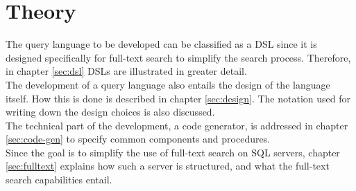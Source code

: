 \newpage
\section{Theory}
The query language to be developed can be classified as a \ac{DSL} since it is designed specifically for full-text search to simplify the search process. Therefore, in chapter \ref{sec:dsl} \ac{DSL}s are illustrated in greater detail.\\
The development of a query language also entails the design of the language itself. How this is done is described in chapter \ref{sec:design}. The notation used for writing down the design choices is also discussed.\\
The technical part of the development, a code generator, is addressed in chapter \ref{sec:code-gen} to specify common components and procedures.\\
Since the goal is to simplify the use of full-text search on \ac{SQL} servers, chapter \ref{sec:fulltext} explains how such a server is structured, and what the full-text search capabilities entail.